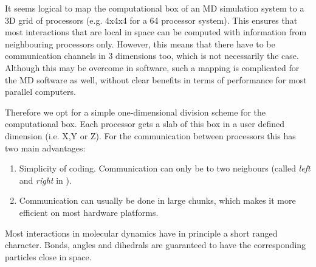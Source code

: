 It seems logical to map the computational box of an MD simulation system 
to a 3D grid of 
processors (e.g. 4x4x4 for a 64 processor system). This ensures that most 
interactions that are local in space can be computed with information from 
neighbouring processors only. However, this means that there have to be
communication channels in 3 dimensions too, which is not necessarily the case.
Although this may be overcome in software, such a mapping is complicated for the MD
software as well, without clear benefits in terms of performance for most
parallel computers. 

Therefore we opt for a simple one-dimensional division scheme
for the computational box. Each processor gets a slab of this box in a user defined
dimension (i.e. X,Y or Z).
For the communication between processors this has two main advantages:
\begin{enumerate}
\item	Simplicity of coding. Communication can only be to two neigbours
	(called {\em left} and {\em right} in {\gromacs}).
\item	Communication can usually be done in large chunks, which makes it
	more efficient on most hardware platforms.
\end{enumerate}

Most interactions in molecular dynamics have in principle a short ranged character.
Bonds, angles and dihedrals are guaranteed to have the corresponding particles 
close in space.


